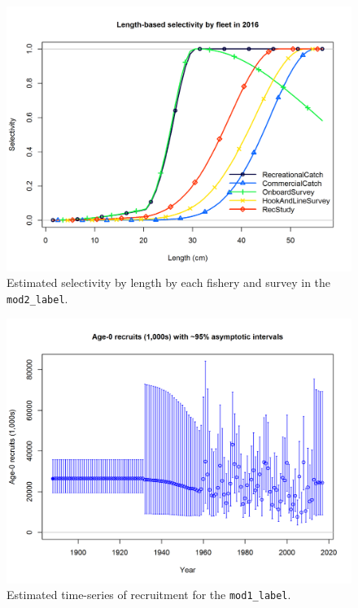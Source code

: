 \documentclass[12pt,]{article}
\begin{document}
\begin{figure}[htbp]
\centering
\includegraphics{r4ss/plots_mod2/sel01_multiple_fleets_length1.png}
\caption{Estimated selectivity by length by each fishery and survey in
the \texttt{mod2\_label}. \label{fig:selex}}
\end{figure}

\FloatBarrier 

\FloatBarrier 

\begin{figure}[htbp]
\centering
\includegraphics{r4ss/plots_mod1/ts11_Age-0_recruits_(1000s)_with_95_asymptotic_intervals.png}
\caption{Estimated time-series of recruitment for the
\texttt{mod1\_label}. \label{fig:recruits1}}
\end{figure}
\end{document}
